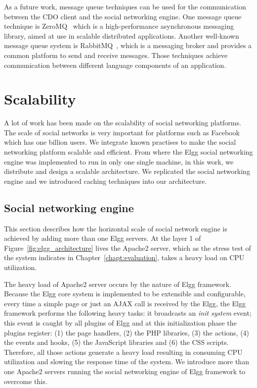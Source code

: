 As a future work, message queue techniques can be used for the communication between the CDO client and the social networking engine. One message queue technique is ZeroMQ~\cite{zeromq_url} which is a high-performance asynchronous messaging library, aimed at use in scalable distributed applications. Another well-known message queue system is RabbitMQ~\cite{rabbitmq_url}, which is a messaging broker and provides a common platform to send and receive messages. Those techniques achieve communication between different language components of an application.

\section{Scalability}
A lot of work has been made on the scalability of social networking platforms. The scale of social networks is very important for platforms such as Facebook which has one billion users. We integrate known practises to make the social networking platform scalable and efficient. From where the Elgg social networking engine was implemented to run in only one single machine, in this work, we distribute and design a scalable architecture. We replicated the social networking engine and we introduced caching techniques into our architecture.

\subsection{Social networking engine}
\label{sec:engine_scale}
This section describes how the horizontal scale of social network engine is achieved by adding more than one Elgg servers. At the layer 1 of Figure~\ref{fig:elgg_architecture} lives the Apache2 server, which as the stress test of the system indicates in Chapter~\ref{chapt:evaluation}, takes a heavy load on CPU utilization. 

The heavy load of Apache2 server occurs by the nature of Elgg framework. Because the Elgg core system is implemented to be extensible and configurable, every time a simple page or just an AJAX call is received by the Elgg, the Elgg framework performs the following heavy tasks: it broadcasts an {\it init system} event; this event is caught by all plugins of Elgg and at this initialization phase the plugins register: (1) the page handlers, (2) the PHP libraries, (3) the actions, (4) the events and hooks, (5) the JavaScript libraries and (6) the CSS scripts. Therefore, all those actions generate a heavy load resulting in consuming CPU utilization and slowing the response time of the system. We introduce more than one Apache2 servers running the social networking engine of Elgg framework to overcome this.  

